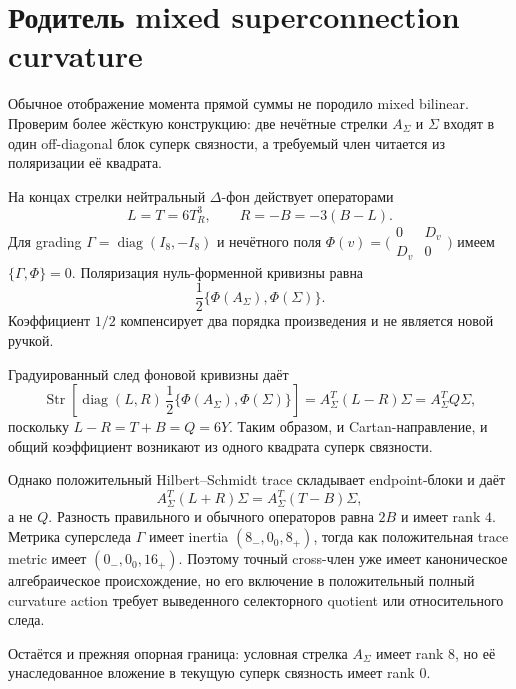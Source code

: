 \chapter{Родитель mixed superconnection curvature}
\label{ch:v10-h15-r2-superconnection-mixed-curvature-parent}

Обычное отображение момента прямой суммы не породило mixed bilinear.
Проверим более жёсткую конструкцию: две нечётные стрелки $A_\Sigma$ и
$\Sigma$ входят в один off-diagonal блок суперк связности, а требуемый
член читается из поляризации её квадрата.

На концах стрелки нейтральный $\Delta$-фон действует операторами
\begin{equation}
 L=T=6T_R^3,
 \qquad R=-B=-3(B-L).
\end{equation}
Для grading $\Gamma=\operatorname{diag}(I_8,-I_8)$ и нечётного поля
$\Phi(v)=\bigl(\begin{smallmatrix}0&D_v\\D_v&0\end{smallmatrix}\bigr)$
имеем $\{\Gamma,\Phi\}=0$. Поляризация нуль-форменной кривизны равна
\begin{equation}
 \frac12\{\Phi(A_\Sigma),\Phi(\Sigma)\}.
\end{equation}
Коэффициент $1/2$ компенсирует два порядка произведения и не является
новой ручкой.

Градуированный след фоновой кривизны даёт
\begin{equation}
 \operatorname{Str}\!\left[
 \operatorname{diag}(L,R)\,
 \frac12\{\Phi(A_\Sigma),\Phi(\Sigma)\}
 \right]
 =A_\Sigma^T(L-R)\Sigma
 =\boxed{A_\Sigma^TQ\Sigma},
\end{equation}
поскольку $L-R=T+B=Q=6Y$. Таким образом, и Cartan-направление, и общий
коэффициент возникают из одного квадрата суперк связности.

Однако положительный Hilbert--Schmidt trace складывает endpoint-блоки и
даёт
\begin{equation}
 A_\Sigma^T(L+R)\Sigma=A_\Sigma^T(T-B)\Sigma,
\end{equation}
а не $Q$. Разность правильного и обычного операторов равна $2B$ и имеет
rank $4$. Метрика суперследа $\Gamma$ имеет inertia $(8_-,0_0,8_+)$,
тогда как положительная trace metric имеет $(0_-,0_0,16_+)$. Поэтому
точный cross-член уже имеет каноническое алгебраическое происхождение, но
его включение в положительный полный curvature action требует выведенного
селекторного quotient или относительного следа.

Остаётся и прежняя опорная граница: условная стрелка $A_\Sigma$ имеет rank
$8$, но её унаследованное вложение в текущую суперк связность имеет rank
$0$.

